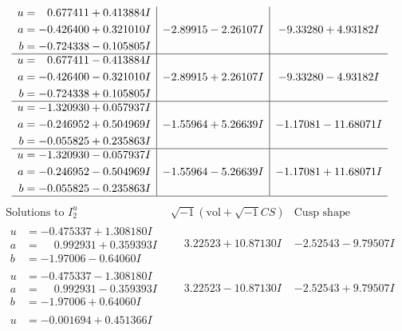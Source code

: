\documentclass[1p]{elsarticle_modified}
\theoremstyle{definition}
\newcommand{\I}{\sqrt{-1}}
\begin{document}
$$\begin{array}{c|c|c}
\begin{aligned}
u &= \phantom{-}0.677411 + 0.413884 I \\
a &= -0.426400 + 0.321010 I \\
b &= -0.724338 - 0.105805 I\end{aligned}
 & -2.89915 - 2.26107 I & -9.33280 + 4.93182 I \\ \hline\begin{aligned}
u &= \phantom{-}0.677411 - 0.413884 I \\
a &= -0.426400 - 0.321010 I \\
b &= -0.724338 + 0.105805 I\end{aligned}
 & -2.89915 + 2.26107 I & -9.33280 - 4.93182 I \\ \hline\begin{aligned}
u &= -1.320930 + 0.057937 I \\
a &= -0.246952 + 0.504969 I \\
b &= -0.055825 + 0.235863 I\end{aligned}
 & -1.55964 + 5.26639 I & -1.17081 - 11.68071 I \\ \hline\begin{aligned}
u &= -1.320930 - 0.057937 I \\
a &= -0.246952 - 0.504969 I \\
b &= -0.055825 - 0.235863 I\end{aligned}
 & -1.55964 - 5.26639 I & -1.17081 + 11.68071 I\\
 \hline 
 \end{array}$$\newpage$$\begin{array}{c|c|c}  
\text{Solutions to }I^u_{2}& \I (\text{vol} + \sqrt{-1}CS) & \text{Cusp shape}\\
 \hline 
\begin{aligned}
u &= -0.475337 + 1.308180 I \\
a &= \phantom{-}0.992931 + 0.359393 I \\
b &= -1.97006 - 0.64060 I\end{aligned}
 & \phantom{-}3.22523 + 10.87130 I & -2.52543 - 9.79507 I \\ \hline\begin{aligned}
u &= -0.475337 - 1.308180 I \\
a &= \phantom{-}0.992931 - 0.359393 I \\
b &= -1.97006 + 0.64060 I\end{aligned}
 & \phantom{-}3.22523 - 10.87130 I & -2.52543 + 9.79507 I \\ \hline\begin{aligned}
u &= -0.001694 + 0.451366 I \\

\end{aligned}
\end{array}$$
\end{document}
